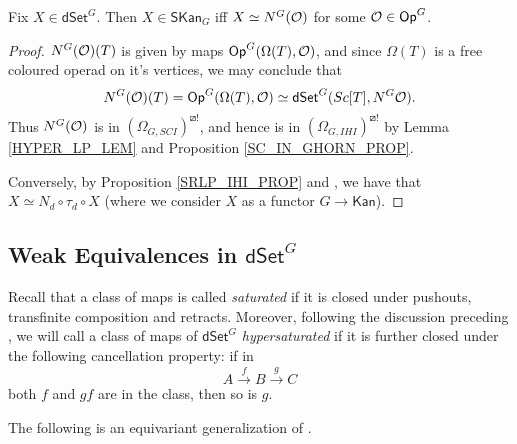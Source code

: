 \documentclass[a4paper,10pt,draft]{article}%
\begin{document}
\begin{corollary}
      Fix $X \in \mathsf{dSet}^G$. Then
      $X \in \mathsf{SKan}_G$ iff $X \simeq N^G(\mathcal{O})$ for some $\mathcal{O} \in \mathsf{Op}^G$.
\end{corollary}
\begin{proof}
      $N^G(\mathcal{O})(T)$ is given by maps $\mathsf{Op}^G(\Omega(T), \mathcal{O})$,
      and since $\Omega(T)$ is a free coloured operad on it's vertices, we may conclude that
      \begin{equation}
            N^G(\mathcal{O})(T) = \mathsf{Op}^G(\Omega(T), \mathcal{O}) \simeq \mathsf{dSet}^G(Sc[T], N^G\mathcal{O}).
      \end{equation}
      Thus $N^G(\mathcal{O})$ is in $(\Omega_{G, SCI})^{\boxslash !}$, and hence is in $(\Omega_{G,IHI})^{\boxslash !}$
      by Lemma \ref{HYPER_LP_LEM} and Proposition \ref{SC_IN_GHORN_PROP}.

      Conversely, by Proposition \ref{SRLP_IHI_PROP} and \cite[Theorem 6.1, Proposition 6.10]{MW09}, we have that
      $X \simeq N_d \circ \tau_d \circ X$
      (where we consider $X$ as a functor $G \to \mathsf{Kan}$).
\end{proof}














\subsection{Weak Equivalences in $\mathsf{dSet}^G$}

Recall that a class of maps is called \textit{saturated}
if it is closed under pushouts, transfinite composition and retracts.
Moreover, following the discussion preceding \cite[Prop. 3.6.8]{HHM16}, we will call a class of maps of $\mathsf{dSet}^G$ \textit{hypersaturated} if it is further closed under the following cancellation property: if in
\[
A \xrightarrow{f} B \xrightarrow{g} C
\]
both $f$ and $gf$ are in the class, then so is $g$.

The following is an equivariant generalization of 
\cite[Props. 2.4 and 2.5]{CM13a}.
\end{document}
